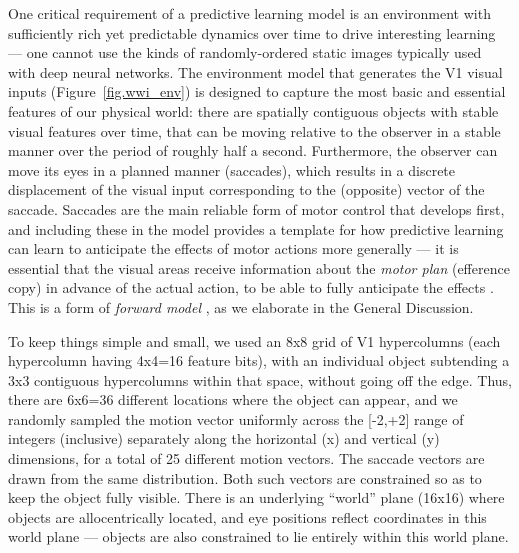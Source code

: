 \documentclass[11pt,twoside]{article}
\newif\myifpdf
\begin{document}
One critical requirement of a predictive learning model is an environment with sufficiently rich yet predictable dynamics over time to drive interesting learning --- one cannot use the kinds of randomly-ordered static images typically used with deep neural networks. The environment model that generates the V1 visual inputs (Figure~\ref{fig.wwi_env}) is designed to capture the most basic and essential features of our physical world: there are spatially contiguous objects with stable visual features over time, that can be moving relative to the observer in a stable manner over the period of roughly half a second.  Furthermore, the observer can move its eyes in a planned manner (saccades), which results in a discrete displacement of the visual input corresponding to the (opposite) vector of the saccade.  Saccades are the main reliable form of motor control that develops first, and including these in the model provides a template for how predictive learning can learn to anticipate the effects of motor actions more generally --- it is essential that the visual areas receive information about the {\em motor plan} (efference copy) in advance of the actual action, to be able to fully anticipate the effects \cite{vonHolst54,Wurtz08}.  This is a form of {\em forward model} \cite{KawatoFurukawaSuzuki87,JordanRumelhart92,MiallWolpert96}, as we elaborate in the General Discussion.

To keep things simple and small, we used an 8x8 grid of V1 hypercolumns (each hypercolumn having 4x4=16 feature bits), with an individual object subtending a 3x3 contiguous hypercolumns within that space, without going off the edge.  Thus, there are 6x6=36 different locations where the object can appear, and we randomly sampled the motion vector uniformly across the [-2,+2] range of integers (inclusive) separately along the horizontal (x) and vertical (y) dimensions, for a total of 25 different motion vectors.  The saccade vectors are drawn from the same distribution.  Both such vectors are constrained so as to keep the object fully visible.  There is an underlying ``world'' plane (16x16) where objects are allocentrically located, and eye positions reflect coordinates in this world plane --- objects are also constrained to lie entirely within this world plane.
\end{document}
